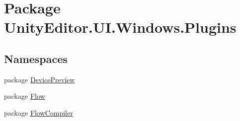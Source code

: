 \hypertarget{namespace_unity_editor_1_1_u_i_1_1_windows_1_1_plugins}{}\section{Package Unity\+Editor.\+U\+I.\+Windows.\+Plugins}
\label{namespace_unity_editor_1_1_u_i_1_1_windows_1_1_plugins}
\subsection*{Namespaces}
\begin{DoxyCompactItemize}
\item 
package \hyperlink{namespace_unity_editor_1_1_u_i_1_1_windows_1_1_plugins_1_1_device_preview}{Device\+Preview}
\item 
package \hyperlink{namespace_unity_editor_1_1_u_i_1_1_windows_1_1_plugins_1_1_flow}{Flow}
\item 
package \hyperlink{namespace_unity_editor_1_1_u_i_1_1_windows_1_1_plugins_1_1_flow_compiler}{Flow\+Compiler}
\end{DoxyCompactItemize}
